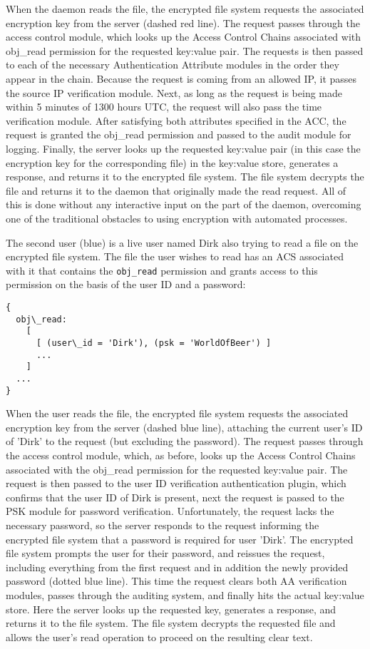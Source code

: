 When the daemon reads the file, the encrypted file system requests the
associated encryption key from the server (dashed red line). The
request passes through the access control module, which looks up the
Access Control Chains associated with obj\_read permission for the
requested key:value pair. The requests is then passed to each of the
necessary Authentication Attribute modules in the order they appear in
the chain. Because the request is coming from an allowed IP, it passes
the source IP verification module. Next, as long as the request is
being made within 5 minutes of 1300 hours UTC, the request will also
pass the time verification module. After satisfying both attributes
specified in the ACC, the request is granted the obj\_read permission
and passed to the audit module for logging. Finally, the server looks
up the requested key:value pair (in this case the encryption key for
the corresponding file) in the key:value store, generates a response,
and returns it to the encrypted file system. The file system decrypts
the file and returns it to the daemon that originally made the read
request. All of this is done without any interactive input on the part
of the daemon, overcoming one of the traditional obstacles to using
encryption with automated processes.

The second user (blue) is a live user named Dirk also trying to read a
file on the encrypted file system. The file the user wishes to read
has an ACS associated with it that contains the \texttt{obj\_read}
permission and grants access to this permission on the basis of the
user ID and a password:

\begin{verbatim}
{
  obj\_read:
    [
      [ (user\_id = 'Dirk'), (psk = 'WorldOfBeer') ]
      ...
    ]
  ...
}
\end{verbatim}

When the user reads the file, the encrypted file system requests the
associated encryption key from the server (dashed blue line),
attaching the current user's ID of 'Dirk' to the request (but
excluding the password). The request passes through the access control
module, which, as before, looks up the Access Control Chains
associated with the obj\_read permission for the requested key:value
pair. The request is then passed to the user ID verification
authentication plugin, which confirms that the user ID of Dirk is
present, next the request is passed to the PSK module for password
verification. Unfortunately, the request lacks the necessary password,
so the server responds to the request informing the encrypted file
system that a password is required for user 'Dirk'. The encrypted file
system prompts the user for their password, and reissues the request,
including everything from the first request and in addition the newly
provided password (dotted blue line). This time the request clears
both AA verification modules, passes through the auditing system, and
finally hits the actual key:value store. Here the server looks up the
requested key, generates a response, and returns it to the file
system. The file system decrypts the requested file and allows the
user's read operation to proceed on the resulting clear text.

